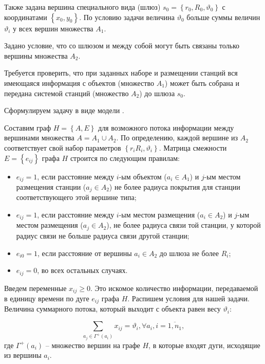 Также задана вершина специального вида (шлюз) $s_0 = \left\{ r_0, R_0, \vartheta_0 \right\} $ с координатами $\left\{x_0, y_0 \right\}$. По условию задачи величина $\vartheta_0$ больше суммы величин $\vartheta_i$ у всех вершин множества $A_1$.

Задано условие, что со шлюзом и между собой могут быть связаны только вершины множества $A_2$.

Требуется проверить, что при заданных наборе и размещении станций вся имеющаяся информация с объектов (множество $A_1$) может быть собрана и передана системой станций (множество $A_2$) до шлюза $s_0$.

Сформулируем задачу в виде модели .

Составим граф $ H = \left\{A,E \right\} $ для возможного потока информации между вершинами множества $ A = A_1 \cup A_2 $. По определению, каждой вершине из $ A_2 $ соответствует свой набор параметров $\left\{ r_i  R_i, \vartheta_i \right\} $.
Матрица смежности $E = \left\{ e_{ij} \right\}$ графа $H$ строится по следующим правилам:

\begin{itemize}
    \item $e_{ij} = 1$, если расстояние между $i$-ым объектом ($a_i \in A_1$) и $j$-ым местом размещения станции ($a_j \in A_2$) не более радиуса покрытия для станции соответствующего этой вершине типа; 
    \item $e_{ij} = 1$, если расстояние между $i$-ым местом размещения ($a_i \in A_2$) и $j$-ым местом размещения  ($a_j \in A_2$), не более радиуса связи той станции, у которой радиус связи не больше радиуса связи другой станции;
    \item $e_{i0} = 1$, если расстояние от вершины $a_i \in A_2$ до шлюза не более $R_i$;
    \item $e_{ij} = 0$, во всех остальных случаях.
\end{itemize}

Введем переменные $x_{ij} \geqslant 0$. Это искомое количество информации, передаваемой в единицу времени по дуге $e_{ij}$ графа $H$.
Распишем условия для нашей задачи.
Величина суммарного потока, который выходит с объекта равен весу $\vartheta_i$:

\begin{equation}\label{eq:part2_1.1}
    \sum_{a_j \in \Gamma^+(a_i)} x_{ij} = \vartheta_i, \forall a_i, i=\overline{1, n_1},
\end{equation}
где $\Gamma^+(a_i)$ – множество вершин на графе $H$, в которые входят дуги, исходящие из вершины $a_i$. 

